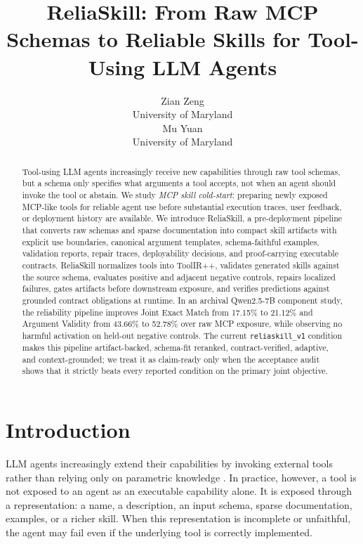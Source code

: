 \documentclass[11pt]{article}
\title{ReliaSkill: From Raw MCP Schemas to Reliable Skills for Tool-Using LLM Agents}
\author{
  Zian Zeng \\
  University of Maryland \\
  \And
  Mu Yuan \\
  University of Maryland \\
}
\newcommand{\method}{ReliaSkill}
\begin{document}
\maketitle

\begin{abstract}
Tool-using LLM agents increasingly receive new capabilities through raw tool schemas, but a schema only specifies what arguments a tool accepts, not when an agent should invoke the tool or abstain. We study \emph{MCP skill cold-start}: preparing newly exposed MCP-like tools for reliable agent use before substantial execution traces, user feedback, or deployment history are available. We introduce \method{}, a pre-deployment pipeline that converts raw schemas and sparse documentation into compact skill artifacts with explicit use boundaries, canonical argument templates, schema-faithful examples, validation reports, repair traces, deployability decisions, and proof-carrying executable contracts. \method{} normalizes tools into ToolIR++, validates generated skills against the source schema, evaluates positive and adjacent negative controls, repairs localized failures, gates artifacts before downstream exposure, and verifies predictions against grounded contract obligations at runtime. In an archival Qwen2.5-7B component study, the reliability pipeline improves Joint Exact Match from 17.15\% to 21.12\% and Argument Validity from 43.66\% to 52.78\% over raw MCP exposure, while observing no harmful activation on held-out negative controls. The current \texttt{reliaskill\_v1} condition makes this pipeline artifact-backed, schema-fit reranked, contract-verified, adaptive, and context-grounded; we treat it as claim-ready only when the acceptance audit shows that it strictly beats every reported condition on the primary joint objective.
\end{abstract}


\section{Introduction}

LLM agents increasingly extend their capabilities by invoking external tools rather than relying only on parametric knowledge \citep{yao2023react,schick2023toolformer,wu2023autogen}. In practice, however, a tool is not exposed to an agent as an executable capability alone. It is exposed through a representation: a name, a description, an input schema, sparse documentation, examples, or a richer skill. When this representation is incomplete or unfaithful, the agent may fail even if the underlying tool is correctly implemented.
\end{document}
